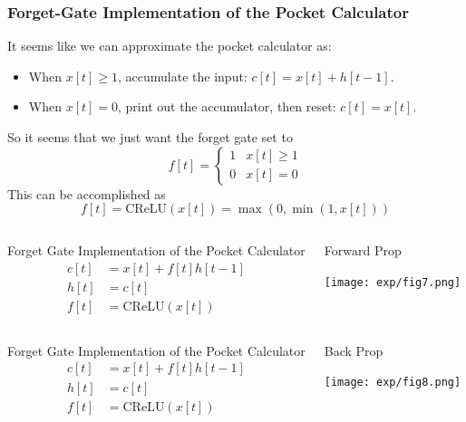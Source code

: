 \documentclass{beamer}
\begin{document}
\begin{frame}
  \frametitle{Forget-Gate Implementation of the Pocket Calculator}

  It seems like we can approximate the pocket calculator as:
  \begin{itemize}
  \item When $x[t]\ge 1$, accumulate the input: $c[t]=x[t]+h[t-1]$.
  \item When $x[t]=0$, print out the accumulator, then reset: $c[t]=x[t]$.
  \end{itemize}
  So it seems that we just want the forget gate set to
  \[
  f[t]=\left\{\begin{array}{ll}
  1 & x[t]\ge 1\\
  0 & x[t]=0
  \end{array}\right.
  \]
  This can be accomplished as
  \[
  f[t]=\mbox{CReLU}\left(x[t]\right)=\max\left(0,\min\left(1,x[t]\right)\right)
  \]
\end{frame}

\begin{frame}
  \begin{columns}
    \column{2in}
    \begin{block}{Forget Gate Implementation of the Pocket Calculator}
      \begin{align*}
        c[t] &= x[t]+f[t]h[t-1]\\
        h[t] &= c[t]\\
        f[t] &= \mbox{CReLU}\left(x[t]\right)
      \end{align*}
    \end{block}
    \column{2.25in}
    \begin{block}{Forward Prop}
      \centerline{\texttt{[image: exp/fig7.png]}}
    \end{block}
    \end{columns}
\end{frame}

\begin{frame}
  \begin{columns}
    \column{2in}
    \begin{block}{Forget Gate Implementation of the Pocket Calculator}
      \begin{align*}
        c[t] &= x[t]+f[t]h[t-1]\\
        h[t] &= c[t]\\
        f[t] &= \mbox{CReLU}\left(x[t]\right)
      \end{align*}
    \end{block}
    \column{2.5in}
    \begin{block}{Back Prop}
      \centerline{\texttt{[image: exp/fig8.png]}}
    \end{block}
    \end{columns}
\end{frame}
\end{document}
